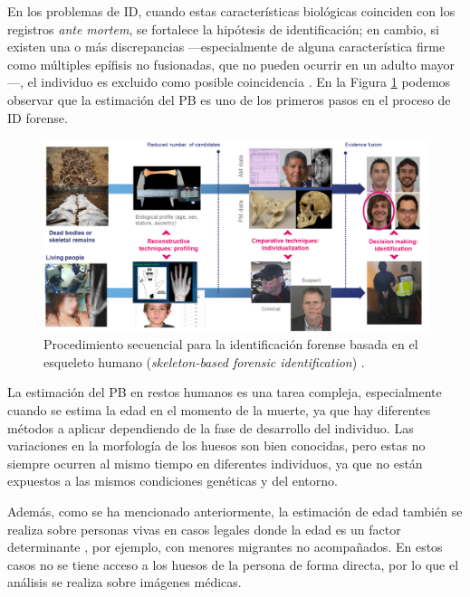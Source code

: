En los problemas de ID, cuando estas características biológicas coinciden con los registros \textit{ante 
mortem}, se fortalece la hipótesis de identificación; en cambio, si existen una o más discrepancias 
---especialmente de alguna característica firme como múltiples epífisis no fusionadas, que no pueden ocurrir 
en un adulto mayor---, el individuo es excluido como posible coincidencia \cite{byers2023}. 
En la Figura \ref{fig:SFI_pipeline} podemos observar que la estimación del PB es uno de los primeros pasos en 
el proceso de ID forense. 

\begin{figure}[h]
    \centering
    \includegraphics[width=\textwidth]{capitulos/cap_01/imagenes/SFI_pipeline.png}
    \caption{Procedimiento secuencial para la identificación forense basada en el esqueleto humano 
            (\textit{skeleton-based forensic identification}) \cite{mesejo2020}.} 
    \label{fig:SFI_pipeline}
\end{figure}

La estimación del PB en restos humanos es una tarea compleja, especialmente cuando se estima la edad en el 
momento de la muerte, ya que hay diferentes métodos a aplicar dependiendo de la fase de desarrollo del 
individuo. Las variaciones en la morfología de los huesos son bien conocidas, pero estas no siempre ocurren 
al mismo tiempo en diferentes individuos, ya que no están expuestos a las mismos condiciones genéticas y del 
entorno.

Además, como se ha mencionado anteriormente, la estimación de edad también se realiza sobre personas vivas
en casos legales donde la edad es un factor determinante \cite{schmeling2016}, por ejemplo, con menores 
migrantes no acompañados. En estos casos no se tiene acceso a los huesos de la persona de forma directa, por 
lo que el análisis se realiza sobre imágenes médicas.



